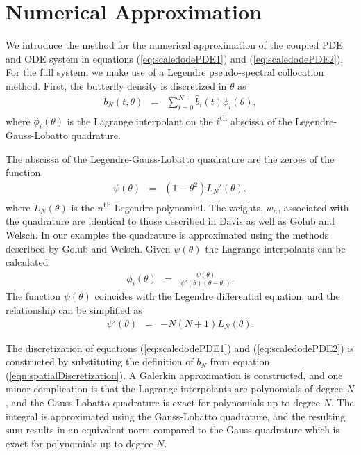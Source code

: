 \documentclass[12pt]{article}
\begin{document}
\section{Numerical Approximation}
\label{numericalApproximation}

We introduce the method for the numerical approximation of the coupled
PDE and ODE system in equations (\ref{eq:scaledodePDE1}) and
(\ref{eq:scaledodePDE2}). For the full system, we make use of a
Legendre pseudo-spectral collocation
method\cite{spectralMethodsFluids,hesthaven_gottlieb_gottlieb_2007,gottlieb1977numerical}. First,
the butterfly density is discretized in $\theta$ as
\begin{eqnarray}
  \label{eqn:spatialDiscretization}
  b_N(t,\theta) & = & \sum^N_{i=0} \hat{b}_i(t) \phi_i(\theta),
\end{eqnarray}
where $\phi_i(\theta)$ is the Lagrange interpolant on the
$i$\textsuperscript{th} abscissa of the Legendre-Gauss-Lobatto
quadrature\cite{hesthaven_gottlieb_gottlieb_2007}.

The abscissa of the Legendre-Gauss-Lobatto quadrature are the zeroes
of the function
\begin{eqnarray}
  \psi(\theta) & = & \left(1-\theta^2\right) L_{N}'(\theta),
\end{eqnarray}
where $L_N(\theta)$ is the $n$\textsuperscript{th} Legendre
polynomial\cite{davis2007methods}.  The weights, $w_n$, associated
with the quadrature are identical to those described in
Davis\cite{davis2007methods} as well as Golub and
Welsch\cite{gaussQuadratureRules}. In our examples the quadrature is
approximated using the methods described by Golub and
Welsch\cite{gaussQuadratureRules}.  Given $\psi(\theta)$ the Lagrange
interpolants can be calculated
\begin{eqnarray}
  \phi_i(\theta) & = & \frac{\psi(\theta)}{\psi'(\theta)(\theta-\theta_i)}.
\end{eqnarray}
The function $\psi(\theta)$ coincides with the Legendre differential
equation, and the relationship can be simplified as
\begin{eqnarray}
  \psi'(\theta) & = & -N(N+1)L_N(\theta).
\end{eqnarray}

The discretization of equations (\ref{eq:scaledodePDE1}) and
(\ref{eq:scaledodePDE2}) is constructed by substituting the definition
of $b_N$ from equation (\ref{eqn:spatialDiscretization}). A Galerkin
approximation is constructed, and one minor complication is that the
Lagrange interpolants are polynomials of degree $N$, and the
Gauss-Lobatto quadrature is exact for polynomials up to degree
$N$. The integral is approximated using the Gauss-Lobatto quadrature,
and the resulting sum results in an equivalent norm compared to the
Gauss quadrature which is exact for polynomials up to degree
$N$\cite{SobolevCanutoQuarteroni}.
\end{document}
